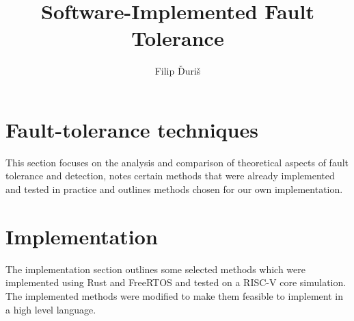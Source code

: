 \documentclass[12pt, letterpaper, slovak]{article}
\title{
    \Huge \textbf{Software-Implemented Fault Tolerance}
}
\author{Filip Ďuriš}
\begin{document}
 


% 


\newpage


\newpage





\tableofcontents
\newpage

\printnoidxglossaries
\newpage


\newpage




\newpage



\section{Fault-tolerance techniques}

This section focuses on the analysis and comparison of theoretical aspects of fault tolerance and detection, notes certain methods that were already implemented and tested in practice and outlines methods chosen for our own implementation.







\clearpage


\newpage


\clearpage

\clearpage
\section{Implementation}

The implementation section outlines some selected methods which were implemented using Rust and FreeRTOS and tested on a RISC-V core simulation. The implemented methods were modified to make them feasible to implement in a high level language.


\clearpage


\clearpage


\clearpage
\end{document}
